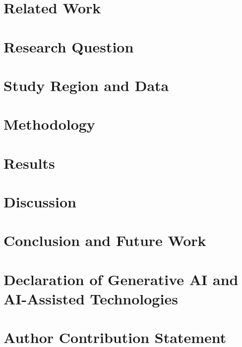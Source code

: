 \documentclass[12pt]{article}
\begin{document}
\section{Related Work}


\section{Research Question}


\section{Study Region and Data}


\section{Methodology}


\section{Results}


\section{Discussion}


\section{Conclusion and Future Work}


\section{Declaration of Generative AI and AI-Assisted Technologies}


\section{Author Contribution Statement}




\end{document}
